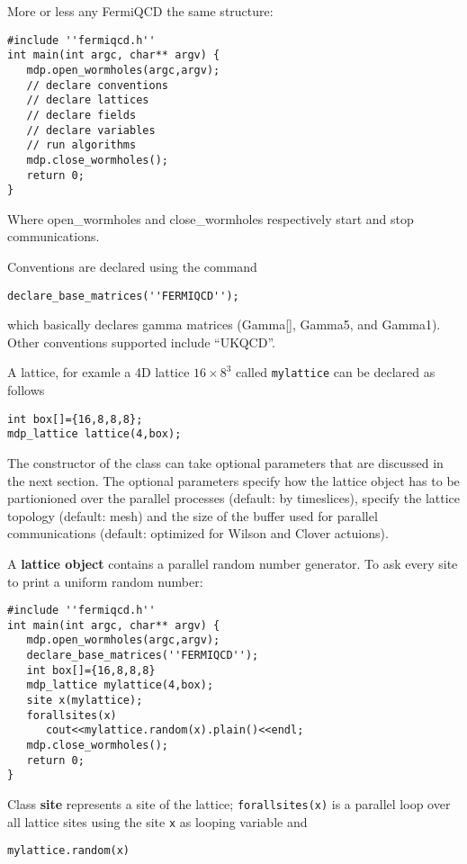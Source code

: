 More or less any FermiQCD the same structure:
\begin{verbatim}
#include ''fermiqcd.h''
int main(int argc, char** argv) {
   mdp.open_wormholes(argc,argv);
   // declare conventions
   // declare lattices
   // declare fields
   // declare variables
   // run algorithms
   mdp.close_wormholes();
   return 0;
}
\end{verbatim}

Where open\_wormholes and close\_wormholes respectively start and stop
communications.

Conventions are declared using the command
\begin{verbatim}
declare_base_matrices(''FERMIQCD'');
\end{verbatim}

which basically declares gamma matrices (Gamma[], Gamma5, and Gamma1). Other
conventions supported include ``UKQCD''.

A lattice, for examle a 4D lattice $16\times 8^3$ called {\tt mylattice} can
be declared as follows
\begin{verbatim}
int box[]={16,8,8,8};
mdp_lattice lattice(4,box);
\end{verbatim}

The constructor of the class can take optional parameters that are discussed
in the next section. The optional parameters specify how the lattice object
has to be partionioned over the parallel processes (default: by timeslices),
specify the lattice topology (default: mesh) and the size of the buffer used
for parallel communications (default: optimized for Wilson and Clover
actuions).

A {\bf lattice object} contains a parallel random number generator. To ask
every site to print a uniform random number:
\begin{verbatim}
#include ''fermiqcd.h''
int main(int argc, char** argv) {
   mdp.open_wormholes(argc,argv);
   declare_base_matrices(''FERMIQCD'');
   int box[]={16,8,8,8}
   mdp_lattice mylattice(4,box);
   site x(mylattice);
   forallsites(x)
      cout<<mylattice.random(x).plain()<<endl;
   mdp.close_wormholes();
   return 0;
}
\end{verbatim}

Class {\bf site} represents a site of the lattice; {\tt forallsites(x)} is a
parallel loop over all lattice sites using the site {\tt x} as looping
variable and
\begin{verbatim}
mylattice.random(x)
\end{verbatim}

